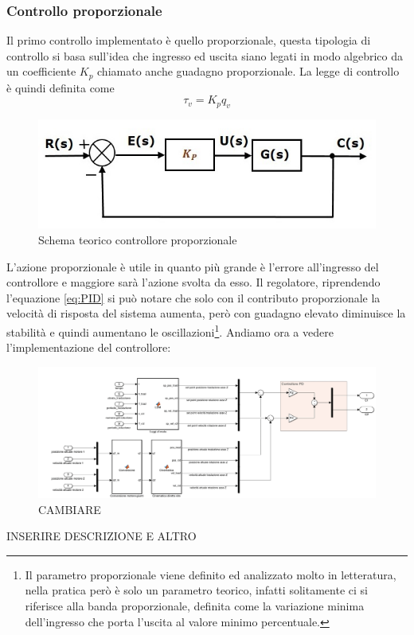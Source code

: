 \subsubsection{Controllo proporzionale}
Il primo controllo implementato è quello proporzionale, questa tipologia di controllo si basa sull'idea che ingresso ed uscita siano legati in modo algebrico da un coefficiente $K_p$ chiamato anche guadagno proporzionale. La legge di controllo è quindi definita come
\begin{equation}
\tau_v = K_p q_v
\end{equation}
\begin{figure}[ht]
	\begin{center}
		\includegraphics[scale=0.6]{Immagini/Controllori/Pschema}
		\caption{Schema teorico controllore proporzionale}
		\label{fig:Pschema}
	\end{center}
\end{figure}
L'azione proporzionale è utile in quanto più grande è l'errore all'ingresso del controllore e maggiore sarà l'azione svolta da esso. Il regolatore, riprendendo l'equazione \ref{eq:PID} si può notare che solo con il contributo proporzionale la velocità di risposta del sistema aumenta, però con guadagno elevato diminuisce la stabilità e quindi aumentano le oscillazioni\footnote{Il parametro proporzionale viene definito ed analizzato molto in letteratura, nella pratica però è solo un parametro teorico, infatti solitamente ci si riferisce alla banda proporzionale, definita come la variazione minima dell'ingresso che porta l'uscita al valore minimo percentuale.}.
Andiamo ora a vedere l'implementazione del controllore:
\begin{figure}[ht]
	\begin{center}
		\includegraphics[scale=0.37]{Immagini/Controllori/Vite}
		\caption{CAMBIARE}
		\label{fig:PVite}
	\end{center}
\end{figure}
INSERIRE DESCRIZIONE E ALTRO
